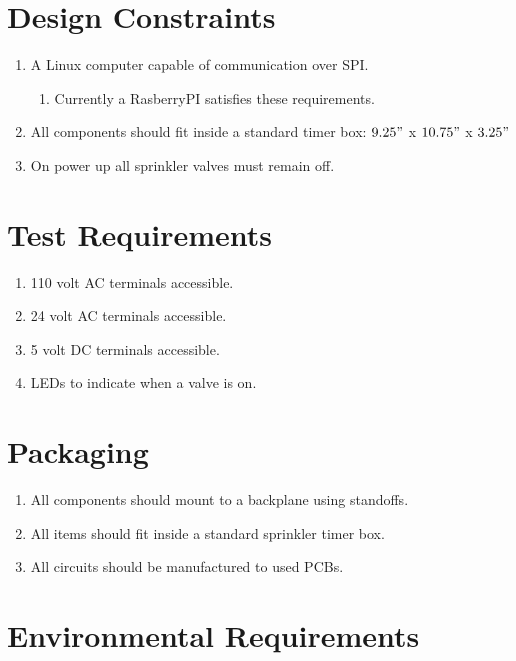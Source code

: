 \documentclass[12pt,letterpaper]{article}
\begin{document}
\section{Design Constraints}

\begin{enumerate}
	\item A Linux computer capable of communication over SPI.
	\begin{enumerate}
		\item Currently a RasberryPI\autocite{rpi} satisfies these requirements.
	\end{enumerate}
	\item All components should fit inside a standard timer box:
		$9.25"$ x $10.75"$ x $3.25"$
	\item On power up all sprinkler valves must remain off.
\end{enumerate}

\section{Test Requirements}

\begin{enumerate}
	\item 110 volt AC terminals accessible.
	\item 24 volt AC terminals accessible.
	\item 5 volt DC terminals accessible.
	\item LEDs to indicate when a valve is on.
\end{enumerate}

\section{Packaging}

\begin{enumerate}
	\item All components should mount to a backplane using standoffs.
	\item All items should fit inside a standard sprinkler timer box.
	\item All circuits should be manufactured to used PCBs.
\end{enumerate}

\section{Environmental Requirements}
\end{document}

